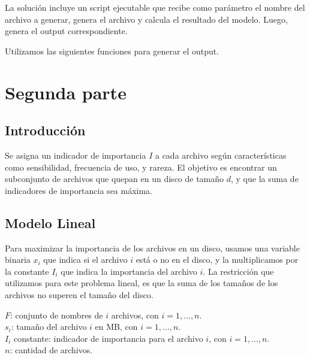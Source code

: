 \documentclass[11pt, a4paper, pdftex]{article}
\begin{document}
La solución incluye un script ejecutable que recibe como parámetro el nombre del 
archivo a generar, genera el archivo y calcula el resultado del modelo. Luego, 
genera el output correspondiente.



\newpage

Utilizamos las siguientes funciones para generar el output.



\newpage
\section{Segunda parte}

\subsection{Introducción}

Se asigna un indicador de importancia $I$ a cada archivo según
características como sensibilidad, frecuencia de uso, y rareza. El
objetivo es encontrar un subconjunto de archivos que quepan en un disco
de tamaño $d$, y que la suma de indicadores de importancia sea máxima.

\subsection{Modelo Lineal}

Para maximizar la importancia de los archivos en un disco, usamos una
variable binaria $x_i$ que indica si el archivo $i$ está o no en el
disco, y la multiplicamos por la constante $I_{i}$ que indica la
importancia del archivo $i$. La restricción que utilizamos para este
problema lineal, es que la suma de los tamaños de los archivos no superen
el tamaño del disco. 

$F$: conjunto de nombres de $i$ archivos, con $i = 1, \ldots, n$. \\

$s_{i}$: tamaño del archivo $i$ en MB, con $i = 1, \ldots, n$. \\

$I_i$ constante: indicador de importancia para el archivo $i$, con $i = 1, \ldots, n$. \\

$n$: cantidad de archivos. \\
\end{document}
